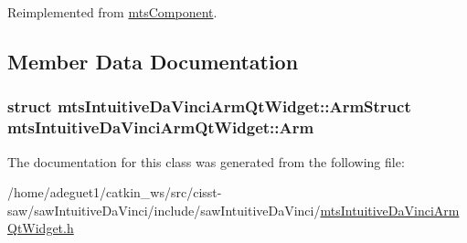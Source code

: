 Reimplemented from \hyperlink{classmts_component_aaf28f0262b44eb6866e10089a02fa6e4}{mts\-Component}.



\subsection{Member Data Documentation}
\hypertarget{classmts_intuitive_da_vinci_arm_qt_widget_adbbfb1dbfa27d6f5ec694c4e93a710d0}{
\subsubsection[{Arm}]{\setlength{\rightskip}{0pt plus 5cm}struct {\bf mts\-Intuitive\-Da\-Vinci\-Arm\-Qt\-Widget\-::\-Arm\-Struct}  mts\-Intuitive\-Da\-Vinci\-Arm\-Qt\-Widget\-::\-Arm\hspace{0.3cm}{\ttfamily [protected]}}}\label{classmts_intuitive_da_vinci_arm_qt_widget_adbbfb1dbfa27d6f5ec694c4e93a710d0}


The documentation for this class was generated from the following file\-:\begin{DoxyCompactItemize}
\item 
/home/adeguet1/catkin\-\_\-ws/src/cisst-\/saw/saw\-Intuitive\-Da\-Vinci/include/saw\-Intuitive\-Da\-Vinci/\hyperlink{mts_intuitive_da_vinci_arm_qt_widget_8h}{mts\-Intuitive\-Da\-Vinci\-Arm\-Qt\-Widget.\-h}\end{DoxyCompactItemize}
